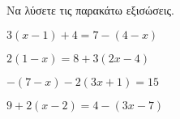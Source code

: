 Να λύσετε τις παρακάτω εξισώσεις.
\begin{multicols}{2}
\begin{alist}
\item $ 3(x-1)+4=7-(4-x) $
\item $ 2(1-x)=8+3(2x-4) $
\item $ -(7-x)-2(3x+1)=15 $
\item $ 9+2(x-2)=4-(3x-7) $
\end{alist}
\end{multicols}
